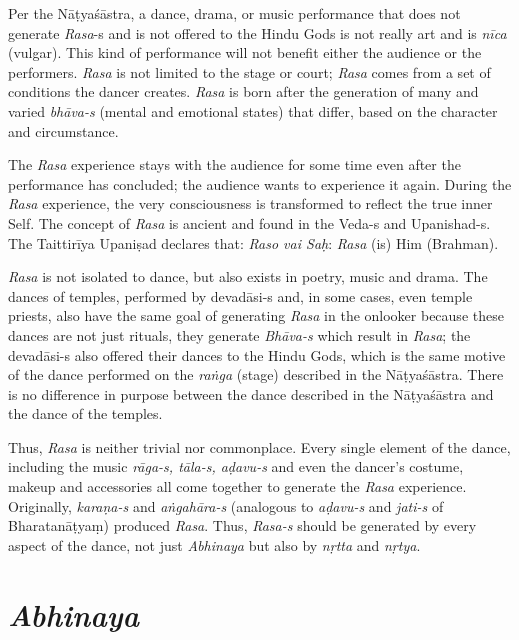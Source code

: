 Per the Nāṭyaśāstra, a dance, drama, or music performance that does not generate \textit{Rasa}-s and is not offered to the Hindu Gods is not really art and is \textit{nīca }(vulgar). This kind of performance will not benefit either the audience or the performers. \textit{Rasa} is not limited to the stage or court; \textit{Rasa} comes from a set of conditions the dancer creates. \textit{Rasa} is born after the generation of many and varied \textit{bhāva-s} (mental and emotional states) that differ, based on the character and circumstance.

The \textit{Rasa} experience stays with the audience for some time even after the performance has concluded; the audience wants to experience it again. During the \textit{Rasa} experience, the very consciousness is transformed to reflect the true inner Self. The concept of \textit{Rasa} is ancient and found in the Veda-s and Upanishad-s. The Taittirīya Upaniṣad declares that: \textit{Raso vai Saḥ}: \textit{Rasa} (is) Him (Brahman).

\newpage

\textit{Rasa} is not isolated to dance, but also exists in poetry, music and drama. The dances of temples, performed by devadāsi-s and, in some cases, even temple priests, also have the same goal of generating \textit{Rasa} in the onlooker because these dances are not just rituals, they generate \textit{Bhāva-s} which result in \textit{Rasa}; the devadāsi-s also offered their dances to the Hindu Gods, which is the same motive of the dance performed on the \textit{raṅga} (stage) described in the Nāṭyaśāstra. There is no difference in purpose between the dance described in the Nāṭyaśāstra and the dance of the temples.

Thus, \textit{Rasa} is neither trivial nor commonplace. Every single element of the dance, including the music \textit{rāga-s, tāla-s, aḍavu-s }and even the dancer’s costume, makeup and accessories all come together to generate the \textit{Rasa} experience. Originally, \textit{karaṇa-s }and \textit{aṅgahāra-s }(analogous to \textit{aḍavu-s} and \textit{jati-s} of Bharatanāṭyaṃ) produced \textit{Rasa}. Thus, \textit{Rasa-s} should be generated by every aspect of the dance, not just \textit{Abhinaya }but also by \textit{nṛtta} and \textit{nṛtya}.


\section*{\textit{Abhinaya}}


